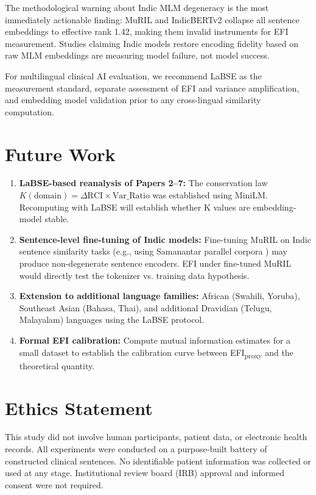 \documentclass[11pt,a4paper]{article}
\begin{document}
The methodological warning about Indic MLM degeneracy is the most immediately actionable
finding: MuRIL and IndicBERTv2 collapse all sentence embeddings to effective rank 1.42,
making them invalid instruments for EFI measurement. Studies claiming Indic models
restore encoding fidelity based on raw MLM embeddings are measuring model failure, not
model success.

For multilingual clinical AI evaluation, we recommend LaBSE as the measurement standard,
separate assessment of EFI and variance amplification, and embedding model validation
prior to any cross-lingual similarity computation.

\section{Future Work}

\begin{enumerate}
    \item \textbf{LaBSE-based reanalysis of Papers 2--7:} The conservation law
    $K(\text{domain}) = \Delta\text{RCI} \times \text{Var\_Ratio}$ was established
    using MiniLM. Recomputing with LaBSE will establish whether K values are
    embedding-model stable.
    \item \textbf{Sentence-level fine-tuning of Indic models:} Fine-tuning MuRIL on
    Indic sentence similarity tasks (e.g., using Samanantar parallel corpora
    \citep{ramesh2022}) may produce non-degenerate sentence encoders. EFI under
    fine-tuned MuRIL would directly test the tokenizer vs. training data hypothesis.
    \item \textbf{Extension to additional language families:} African (Swahili, Yoruba),
    Southeast Asian (Bahasa, Thai), and additional Dravidian (Telugu, Malayalam)
    languages using the LaBSE protocol.
    \item \textbf{Formal EFI calibration:} Compute mutual information estimates for a
    small dataset to establish the calibration curve between
    EFI\textsubscript{proxy} and the theoretical quantity.
\end{enumerate}

\section*{Ethics Statement}

This study did not involve human participants, patient data, or electronic health
records. All experiments were conducted on a purpose-built battery of constructed
clinical sentences. No identifiable patient information was collected or used at any
stage. Institutional review board (IRB) approval and informed consent were not required.
\end{document}
